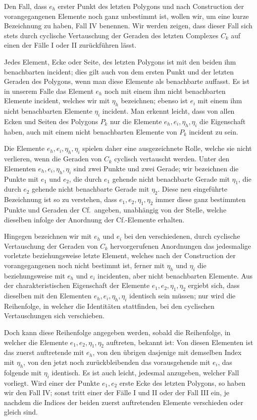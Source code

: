 \documentclass[11pt]{article}
\newcommand{\Cf}{\textup{Cf.}}
\begin{document}
Den Fall, dass $e_h$ erster Punkt des letzten Polygons und nach Construction der vorangegangenen Elemente noch ganz unbestimmt ist, wollen wir, um eine kurze Bezeichnung zu haben, Fall IV benennen. Wir werden zeigen, dass dieser Fall sich stets durch cyclische Vertauschung der Geraden des letzten Complexes $C_k$ auf einen der Fälle I oder II zurückführen lässt.

Jedes Element, Ecke oder Seite, des letzten Polygons ist mit den beiden ihm benachbarten incident; dies gilt auch von dem ersten Punkt und der letzten Geraden des Polygons, wenn man diese Elemente als benachbarte auffasst. Es ist in unserem Falle das Element $e_h$ noch mit einem ihm nicht benachbarten Elemente incident, welches wir mit $\eta_h$ bezeichnen; ebenso ist $e_i$ mit einem ihm nicht benachbarten Elemente $\eta_i$ incident. Man erkennt leicht, dass von allen Ecken und Seiten des Polygons $P_k$ nur die Elemente $e_h,e_i,\eta_h,\eta_i$ die Eigenschaft haben, auch mit einem nicht benachbarten Elemente von $P_k$ incident zu sein.

Die Elemente $e_h,e_i,\eta_h,\eta_i$ spielen daher eine ausgezeichnete Rolle, welche sie nicht verlieren, wenn die Geraden von $C_k$ cyclisch vertauscht werden. Unter den Elementen $e_h,e_i,\eta_h,\eta_i$ sind zwei Punkte und zwei Gerade; wir bezeichnen die Punkte mit $e_1$ und $e_2$, die durch $e_1$ gehende nicht benachbarte Gerade mit $\eta_1$, die durch $e_2$ gehende nicht benachbarte Gerade mit $\eta_2$. Diese neu eingeführte Bezeichnung ist so zu verstehen, dass $e_1,e_2,\eta_1,\eta_2$ immer diese ganz bestimmten Punkte und Geraden der \Cf\ angeben, unabhängig von der Stelle, welche dieselben infolge der Anordnung der \Cf-Elemente erhalten.

Hingegen bezeichnen wir mit $e_h$ und $e_i$ bei den verschiedenen, durch cyclische Vertauschung der Geraden von $C_k$ hervorgerufenen Anordnungen das jedesmalige vorletzte beziehungsweise letzte Element, welches nach der Construction der vorangegangenen noch nicht bestimmt ist, ferner mit $\eta_h$ und $\eta_i$ die beziehungsweise mit $e_h$ und $e_i$ incidenten, aber nicht benachbarten Elemente. Aus der charakteristischen Eigenschaft der Elemente $e_1,e_2,\eta_1,\eta_2$ ergiebt sich, dass dieselben mit den Elementen $e_h,e_i,\eta_h,\eta_i$ identisch sein müssen; nur wird die Reihenfolge, in welcher die Identitäten stattfinden, bei den cyclischen Vertauschungen sich verschieben.

Doch kann diese Reihenfolge angegeben werden, sobald die Reihenfolge, in welcher die Elemente $e_1,e_2,\eta_1,\eta_2$ auftreten, bekannt ist: Von diesen Elementen ist das zuerst auftretende mit $e_h$, von den übrigen dasjenige mit demselben Index mit $\eta_h$, von den jetzt noch zurückbleibenden das vorausgehende mit $e_i$, das folgende mit $\eta_i$ identisch. Es ist auch leicht, jedesmal anzugeben, welcher Fall vorliegt. Wird einer der Punkte $e_1,e_2$ erste Ecke des letzten Polygons, so haben wir den Fall IV; sonst tritt einer der Fälle I und II oder der Fall III ein, je nachdem die Indices der beiden zuerst auftretenden Elemente verschieden oder gleich sind.
\end{document}
